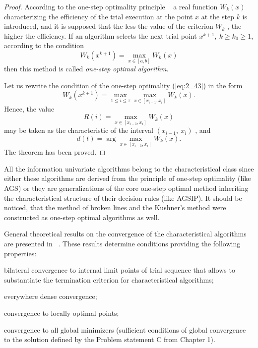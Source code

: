 \begin{proof}
According to the one-step optimality principle ~\cite{2_Mockus, 2_StrMonRus, 2_StrSergMon2000} a real function $W_k(x)$  characterizing the efficiency of the trial execution at the point $x$ at the step $k$ is introduced, and it is supposed that the less the value of the criterion $W_k$ , the higher the efficiency. If an algorithm selects the next trial point $x^{k+1},\:k\geq k_0\geq 1$, according to the condition 
\begin{equation}
\label{eq:2_43}
W_k(x^{k+1})=\max_{x\in [a,b]}W_k(x)
\end{equation}
then this method is called \textit{one-step optimal algorithm}.

Let us rewrite the condition of the one-step optimality (\ref{eq:2_43}) in the form 
\begin{displaymath}
W_k(x^{k+1})=\max_{1\leq i\leq \tau}\max_{x\in [x_{i-1},x_i]}W_k(x).
\end{displaymath}
Hence, the value
\begin{displaymath}
R(i)=\max_{x\in [x_{i-1},x_i]}W_k(x)
\end{displaymath}
may be taken as the characteristic of the interval $(x_{i-1},\:x_i)$ , and
\begin{displaymath}
d(t)=\arg \max_{x\in [x_{i-1},x_i]}W_k(x).
\end{displaymath}
The theorem has been proved.
\end{proof}

All the information univariate algorithms belong to the characteristical class since either these algorithms are derived from the principle of one-step optimality (like AGS) or they are generalizations of the core one-step optimal method inheriting the characteristical structure of their decision rules (like AGSIP). It should be noticed, that the method of broken lines and the Kushner's method were constructed as one-step optimal algorithms as well. 

General theoretical results on the convergence of the characteristical algorithms are presented in ~\cite{2_GrishaginCharAlg, 2_GrishaginSergeyevStrongin}. These results determine conditions providing the following properties:
\begin{description}[i)]
\item [i)] {bilateral convergence to internal limit points of trial sequence that allows to substantiate the  termination criterion for characteristical algorithms;}
\item [ii)] {everywhere dense convergence;}
\item [iii)] {convergence to locally optimal points;}
\item [iv)] {convergence to all global minimizers (sufficient conditions of global convergence to the solution defined by the Problem statement C from Chapter 1).}
\end{description}

